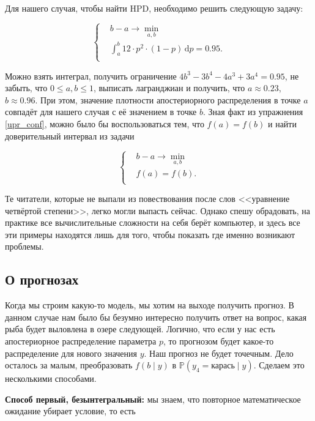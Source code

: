 \documentclass[12pt, a4paper, oneside]{extreport}
\def \mbb{\mathbb}
\def \PP{\mbb{P}}
\newcommand{\dx}[1]{\,\mathrm{d}#1} %
\theoremstyle{plain}              %
\theoremstyle{definition}         %
\begin{document}
Для нашего случая, чтобы найти HPD, необходимо решить следующую задачу:

\begin{equation*}
	\left \{
	\begin{aligned}
		&b - a \longrightarrow \min_{a,b} \\
		&\int_a^b 12\cdot p^2 \cdot (1-p) \dx{p} = 0.95. \\
	\end{aligned}
	\right.
\end{equation*}

Можно взять интеграл, получить ограничение $4b^3 - 3b^4 -4a^3 + 3a^4 = 0.95$, не забыть, что $0 \le a,b \le 1$, выписать лагранджиан и получить, что $a \approx 0.23 $, $b \approx0.96 $. При этом, значение плотности апостериорного распределения в точке $a$ совпадёт для нашего случая с её значением в точке $b$. Зная факт из упражнения \ref{upr_conf}, можно было бы воспользоваться тем, что $f(a) = f(b)$ и найти доверительный интервал из задачи

\begin{equation*}
	\left \{
	\begin{aligned}
		&b - a \longrightarrow \min_{a,b} \\
		&f(a) = f(b).  \\
	\end{aligned}
	\right.
\end{equation*}

Те читатели, которые не выпали из повествования после слов <<уравнение четвёртой степени>>, легко могли выпасть сейчас. Однако спешу обрадовать, на практике все вычислительные сложности на себя берёт компьютер, и здесь все эти примеры находятся лишь для того, чтобы показать где именно возникают проблемы.

\subsection*{О прогнозах} 

Когда мы строим какую-то модель, мы хотим на выходе получить прогноз. В данном случае нам было бы безумно интересно получить ответ на вопрос, какая рыба будет выловлена в озере следующей. Логично, что если у нас есть апостериорное распределение параметра $p$, то прогнозом будет какое-то распределение для нового значения $y$. Наш прогноз не будет точечным. Дело осталось за малым, преобразовать $f(b \mid y)$ в $\PP(y_4 = \text{карась} \mid y)$. Сделаем это несколькими способами.

\textbf{Способ первый, безынтегральный:} мы знаем, что повторное математическое ожидание убирает условие, то есть 
\end{document}
